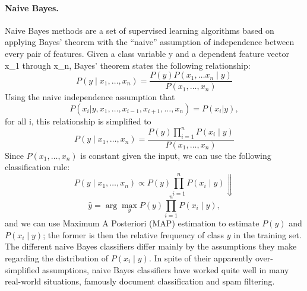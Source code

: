 
\paragraph{Naive Bayes.}
\label{naiveBayes}
Naive Bayes methods are a set of supervised learning algorithms based on
applying Bayes’ theorem with the “naive” assumption of independence
between every pair of features.
%
Given a class variable y and a dependent feature vector x\_1 through x\_n,
Bayes’ theorem states the following relationship:
\begin{equation}
P(y \mid x_1, \dots, x_n) = \frac{P(y) P(x_1, \dots x_n \mid y)}
{P(x_1, \dots, x_n)}
\end{equation}
Using the naive independence assumption that
\begin{equation}
P(x_i | y, x_1, \dots, x_{i-1}, x_{i+1}, \dots, x_n) = P(x_i | y),
\end{equation}
for all i, this relationship is simplified to
\begin{equation}
P(y \mid x_1, \dots, x_n) = \frac{P(y) \prod_{i=1}^{n} P(x_i \mid y)}
{P(x_1, \dots, x_n)}
\end{equation}
Since $P(x_1, \dots, x_n)$ is constant given the input, we can use the following
classification rule:
\begin{equation}
P(y \mid x_1, \dots, x_n) \propto P(y) \prod_{i=1}^{n} P(x_i \mid y)
\Downarrow
\end{equation}
\begin{equation}
\hat{y} = \arg\max_y P(y) \prod_{i=1}^{n} P(x_i \mid y),
\end{equation}
and we can use Maximum A Posteriori (MAP) estimation to estimate $P(y)$ and
$P(x_i \mid y)$; the former is then the relative frequency of class $y$ in the
training set.
%
The different naive Bayes classifiers differ mainly by the assumptions they make
regarding the distribution of $P(x_i \mid y)$.
%
In spite of their apparently over-simplified assumptions, naive Bayes
classifiers have worked quite well in many real-world situations, famously
document classification and spam filtering.
